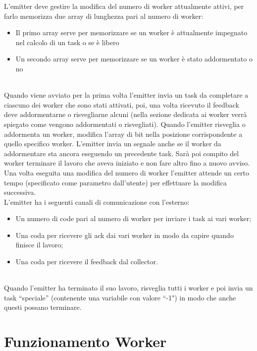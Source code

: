 \documentclass[12pt]{report}
\begin{document}
L'emitter deve gestire la modifica del numero di worker attualmente attivi, per farlo memorizza due array di lunghezza pari al numero di worker:
\begin{itemize}
\item Il primo array serve per memorizzare se un worker è attualmente impegnato nel calcolo di un task o se è libero
\item Un secondo array serve per memorizzare se un worker è stato addormentato o no
\end{itemize}\\Quando viene avviato per la prima volta l'emitter invia un task da completare a ciascuno dei worker che sono stati attivati, poi, una volta ricevuto il feedback deve addormentarne o risvegliarne alcuni (nella sezione dedicata ai worker verrà spiegato come vengono addormentati o risvegliati).
Quando l'emitter risveglia o addormenta un worker, modifica l'array di bit nella posizione corrispondente a quello specifico worker.
L'emitter invia un segnale anche se il worker da addormentare sta ancora eseguendo un precedente task. Sarà poi compito del worker terminare il lavoro che aveva iniziato e non fare altro fino a nuovo avviso.\\Una volta eseguita una modifica del numero di worker l'emitter attende un certo tempo (specificato come parametro dall'utente) per effettuare la modifica successiva. \\L'emitter ha i seguenti canali di comunicazione con l'esterno:
\begin{itemize}
\item Un numero di code pari al numero di worker per inviare i task ai vari worker;
\item Una coda per ricevere gli ack dai vari worker in modo da capire quando finisce il lavoro;
\item Una coda per ricevere il feedback dal collector.
\end{itemize}\\Quando l'emitter ha terminato il suo lavoro, risveglia tutti i worker e poi invia un task ``speciale'' (contenente una variabile con valore ``-1") in modo che anche questi possano terminare.

\section{Funzionamento Worker}
\end{document}
